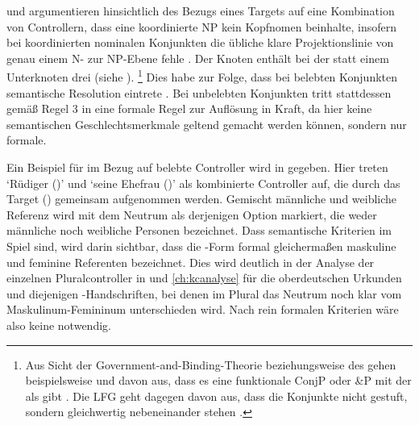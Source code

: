 \citet[182--183]{wechslerzlatic2003} und \citet[576]{wechsler2009}
argumentieren hinsichtlich des Bezugs eines Targets auf eine
Kombination von Controllern, dass eine koordinierte
NP kein Kopf\-nomen beinhalte,
insofern bei koordinierten nominalen Konjunkten die übliche klare
Projektionslinie von genau einem N- zur NP-Ebene fehle
\autocites[183, Fußnote 85]{wechslerzlatic2003}[585, Fußnote 7]{wechsler2009}.
Der Knoten  enthält bei der  statt einem Unterknoten
drei (siehe
).%
%
	\footnote{Aus Sicht der Government-and-Binding-Theorie beziehungsweise des  gehen beispielsweise
	\textcites{johannessen1998}{johannessen2005} und \citet{shen2019} davon
	aus, dass es eine funktionale ConjP oder \&P mit der  als
	 gibt \autocite[dagegen aber][]{borsley2005}. Die
	LFG geht dagegen davon aus, dass die
	Konjunkte nicht gestuft, sondern gleichwertig nebeneinander stehen
	\autocites[vgl.~z.\,B.][]{peterson2004}{sadlernordlinger2006}.}
%
Dies habe zur Folge, dass bei belebten Konjunkten semantische Resolution
eintrete \autocites[183]{wechslerzlatic2003}[576]{wechsler2009}. Bei
unbelebten Konjunkten tritt stattdessen gemäß Regel 3 in
 eine formale Regel zur Auflösung in
Kraft, da hier keine semantischen
Geschlechtsmerkmale geltend gemacht
werden können, sondern nur formale.

Ein Beispiel für  im Bezug auf belebte Controller wird
in  gegeben. Hier treten  `Rüdiger (\MascM)' und
 `seine Ehefrau (\FemF)' als kombinierte Controller auf, die
durch das Target  (\NeutMF) gemeinsam aufgenommen werden.
Gemischt männliche und weibliche Referenz wird mit dem Neutrum als derjenigen
Option markiert, die weder männliche noch weibliche Personen bezeichnet. Dass
semantische Kriterien im Spiel sind, wird darin sichtbar, dass die
-Form formal gleichermaßen maskuline und feminine Referenten
bezeichnet. Dies wird deutlich in der Analyse der einzelnen Pluralcontroller in
 und \ref{ch:kcanalyse} für die
oberdeutschen Urkunden und diejenigen \KC{}-Handschriften, bei
denen im Plural das Neutrum noch klar vom Maskulinum-Femininum unterschieden
wird. Nach rein formalen Kriterien wäre also keine 
notwendig.

